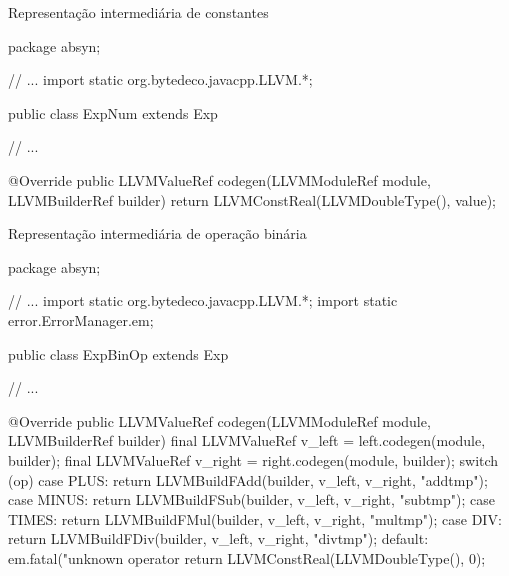 \documentclass[smaller]{beamer}
\begin{document}
\begin{frame}{Representação intermediária de constantes}
\begin{pygmented}[]
package absyn;

// ...
import static org.bytedeco.javacpp.LLVM.*;

public class ExpNum extends Exp {
   // ...

   @Override
   public LLVMValueRef codegen(LLVMModuleRef module,
                               LLVMBuilderRef builder) {
      return LLVMConstReal(LLVMDoubleType(), value);
   }
}
\end{pygmented}
\end{frame}

\begin{frame}{Representação intermediária de operação binária}
\begin{pygmented}[]
package absyn;

// ...
import static org.bytedeco.javacpp.LLVM.*;
import static error.ErrorManager.em;

public class ExpBinOp extends Exp {
   // ...

   @Override
   public LLVMValueRef codegen(LLVMModuleRef module, LLVMBuilderRef builder) {
      final LLVMValueRef v_left = left.codegen(module, builder);
      final LLVMValueRef v_right = right.codegen(module, builder);
      switch (op) {
         case PLUS:  return LLVMBuildFAdd(builder, v_left, v_right, "addtmp");
         case MINUS: return LLVMBuildFSub(builder, v_left, v_right, "subtmp");
         case TIMES: return LLVMBuildFMul(builder, v_left, v_right, "multmp");
         case DIV:   return LLVMBuildFDiv(builder, v_left, v_right, "divtmp");
         default:    em.fatal("unknown operator %
                     return LLVMConstReal(LLVMDoubleType(), 0);
      }
   }
}
\end{pygmented}
\end{frame}
\end{document}
